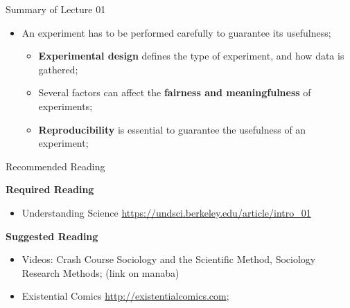 \documentclass[aspectratio=169]{beamer}
\begin{document}
\begin{CJK}{UTF8}{ipxm}
\begin{frame}{Summary of Lecture 01}
\begin{itemize}
    \item An experiment has to be performed carefully to guarantee its usefulness;
    \begin{itemize}
      \item {\bf Experimental design} defines the type of experiment, and how data is gathered;
      \item Several factors can affect the {\bf fairness and meaningfulness} of experiments;
      \item {\bf Reproducibility} is essential to guarantee the usefulness of an experiment;
    \end{itemize}
  \end{itemize}

\end{frame}

\begin{frame}{Recommended Reading}

  {\bf Required Reading}
  \begin{itemize}
    \item Understanding Science \url{https://undsci.berkeley.edu/article/intro_01}
  \end{itemize}
  \bigskip

  {\bf Suggested Reading}
  \begin{itemize}
    \item Videos: Crash Course Sociology and the Scientific Method, Sociology Research Methods; (link on manaba)
    \item Existential Comics \url{http://existentialcomics.com};
  \end{itemize}
\end{frame}





\end{CJK}
\end{document}
